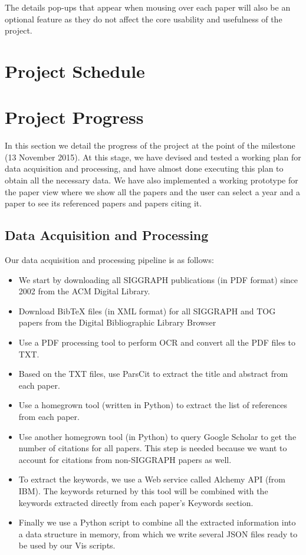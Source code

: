 \documentclass[dvips,12pt]{article}
\begin{document}
The details pop-ups that appear when mousing over each paper will also be an optional feature as they do not affect the core usability and usefulness of the project.

\section{Project Schedule}


\section{Project Progress}
In this section we detail the progress of the project at the point of the milestone (13 November 2015). At this stage, we have devised and tested a working plan for data acquisition and processing, and have almost done executing this plan to obtain all the necessary data. We have also implemented a working prototype for the paper view where we show all the papers and the user can select a year and a paper to see its referenced papers and papers citing it.
\subsection{Data Acquisition and Processing}
Our data acquisition and processing pipeline is as follows:
\begin{itemize}
    \item We start by downloading all SIGGRAPH publications (in PDF format) since 2002 from the ACM Digital Library. 
    \item Download BibTeX files (in XML format) for all SIGGRAPH and TOG papers from the Digital Bibliographic Library Browser
    \item Use a PDF processing tool to perform OCR and convert all the PDF files to TXT.
    \item Based on the TXT files, use ParsCit to extract the title and abstract from each paper.
    \item Use a homegrown tool (written in Python) to extract the list of references from each paper.
    \item Use another homegrown tool (in Python) to query Google Scholar to get the number of citations for all papers. This step is needed because we want to account for citations from non-SIGGRAPH papers as well.
    \item To extract the keywords, we use a Web service called Alchemy API (from IBM). The keywords returned by this tool will be combined with the keywords extracted directly from each paper's Keywords section.
    \item Finally we use a Python script to combine all the extracted information into a data structure in memory, from which we write several JSON files ready to be used by our Vis scripts.
\end{itemize}
\end{document}
